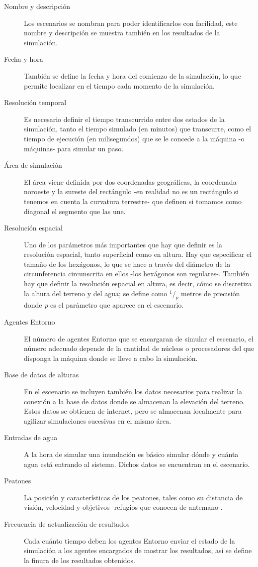 \begin{description}
 \item[Nombre y descripción] Los escenarios se nombran para poder
identificarlos con facilidad, este nombre y descripción se muestra también en
los resultados de la simulación.
 \item[Fecha y hora] También se define la fecha y hora del comienzo de la
simulación, lo que permite localizar en el tiempo cada momento de la simulación.
 \item[Resolución temporal] Es necesario definir el tiempo transcurrido entre
dos estados de la simulación, tanto el tiempo simulado (en minutos) que
transcurre, como el tiempo de ejecución (en milisegundos) que se le concede a
la máquina -o máquinas- para simular un paso.
 \item[Área de simulación] El área viene definida por dos coordenadas
geográficas, la coordenada noroeste y la sureste del rectángulo -en realidad
no es un rectángulo si tenemos en cuenta la curvatura terrestre- que definen si
tomamos como diagonal el segmento que las une.
 \item[Resolución espacial] Uno de los parámetros más importantes que hay que
definir es la resolución espacial, tanto superficial como en altura. Hay que
especificar el tamaño de los hexágonos, lo que se hace a través del diámetro de
la circunferencia circunscrita en ellos -los hexágonos son regulares-. También
hay que definir la resolución espacial en altura, es decir, cómo se discretiza
la altura del terreno y del agua; se define como \begin{math}^1/_p\end{math}
metros de precisión donde {\em p} es el parámetro que aparece en el escenario.
 \item[Agentes Entorno] El número de agentes Entorno que se encargaran de
simular el escenario, el número adecuado depende de la cantidad de núcleos o
procesadores del que disponga la máquina donde se lleve a cabo la simulación.
 \item[Base de datos de alturas] En el escenario se incluyen también los datos
necesarios para realizar la conexión a la base de datos donde se almacenan la
elevación del terreno. Estos datos se obtienen de internet, pero se almacenan
localmente para agilizar simulaciones sucesivas en el mismo área.
 \item[Entradas de agua] A la hora de simular una inundación es básico simular
dónde y cuánta agua está entrando al sistema. Dichos datos se encuentran en el
escenario.
 \item[Peatones] La posición y características de los peatones, tales como su
distancia de visión, velocidad y objetivos -refugios que conocen de antemano-.
 \item[Frecuencia de actualización de resultados] Cada cuánto tiempo deben los
agentes Entorno enviar el estado de la simulación a los agentes encargados de
mostrar los resultados, así se define la finura de los resultados obtenidos.
\end{description}

